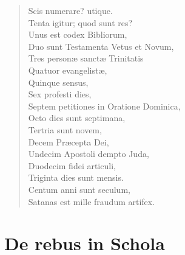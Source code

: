 \begin{verse}

  Scis numerare? utique.\\
  Tenta igitur; quod sunt res?\\
  Unus est codex Bibliorum,\\
  Duo sunt Testamenta Vetus et Novum,\\
  Tres personæ sanctæ Trinitatis\\
  Quatuor evangelistæ,\\
  Quinque sensus,\\
  Sex profesti dies,\\
  Septem petitiones in Oratione Dominica,\\
  Octo dies sunt septimana,\\
  Tertria sunt novem,\\
  Decem Præcepta Dei,\\
  Undecim Apostoli dempto Juda,\\
  Duodecim fidei articuli,\\
  Triginta dies sunt mensis.\\
  Centum anni sunt seculum,\\
  Satanas est mille fraudum artifex.\\
\end{verse}



\chapter{De rebus in Schola}


